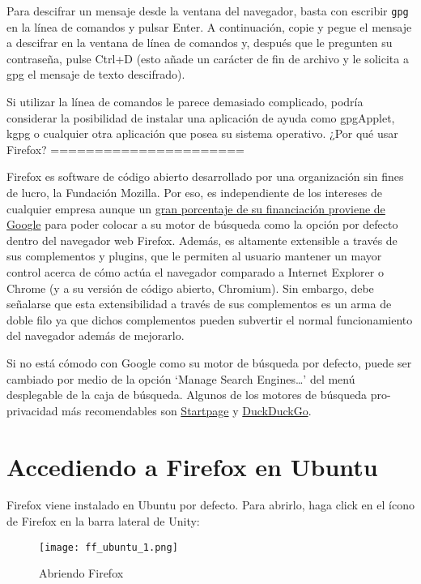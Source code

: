 \documentclass[10pt,a5paper,twoside,,]{book}
\begin{document}
Para descifrar un mensaje desde la ventana del navegador, basta con
escribir \texttt{gpg} en la línea de comandos y pulsar Enter. A
continuación, copie y pegue el mensaje a descifrar en la ventana de
línea de comandos y, después que le pregunten su contraseña, pulse
Ctrl+D (esto añade un carácter de fin de archivo y le solicita a gpg el
mensaje de texto descifrado).

Si utilizar la línea de comandos le parece demasiado complicado, podría
considerar la posibilidad de instalar una aplicación de ayuda como
gpgApplet, kgpg o cualquier otra aplicación que posea su sistema
operativo. ¿Por qué usar Firefox? ======================

Firefox es software de código abierto desarrollado por una organización
sin fines de lucro, la Fundación Mozilla. Por eso, es independiente de
los intereses de cualquier empresa aunque un
\href{https://en.wikipedia.org/wiki/Mozilla_Foundation\#Financing}{gran
porcentaje de su financiación proviene de Google} para poder colocar a
su motor de búsqueda como la opción por defecto dentro del navegador web
Firefox. Además, es altamente extensible a través de sus complementos y
plugins, que le permiten al usuario mantener un mayor control acerca de
cómo actúa el navegador comparado a Internet Explorer o Chrome (y a su
versión de código abierto, Chromium). Sin embargo, debe señalarse que
esta extensibilidad a través de sus complementos es un arma de doble
filo ya que dichos complementos pueden subvertir el normal
funcionamiento del navegador además de mejorarlo.

Si no está cómodo con Google como su motor de búsqueda por defecto,
puede ser cambiado por medio de la opción `Manage Search
Engines\ldots{}' del menú desplegable de la caja de búsqueda. Algunos de
los motores de búsqueda pro-privacidad más recomendables son
\href{https://www.startpage.com/}{Startpage} y
\href{https://duckduckgo.com/}{DuckDuckGo}.

\chapter{Accediendo a Firefox en
Ubuntu}\label{accediendo-a-firefox-en-ubuntu}

Firefox viene instalado en Ubuntu por defecto. Para abrirlo, haga click
en el ícono de Firefox en la barra lateral de Unity:

\begin{figure}[htbp]
\centering
\texttt{[image: ff\_ubuntu\_1.png]}
\caption{Abriendo Firefox}
\end{figure}
\end{document}
